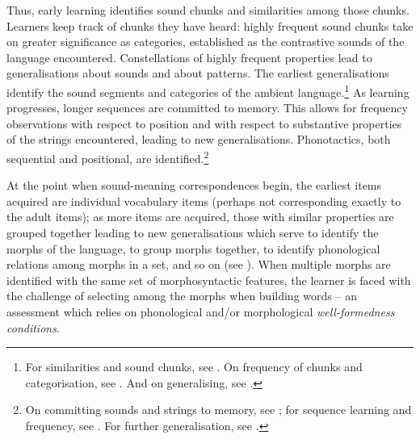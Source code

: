 Thus, early learning identifies sound chunks and similarities among those chunks. Learners keep track of chunks they have heard: highly frequent sound chunks take on greater significance as categories, established as the contrastive sounds of the language encountered. Constellations of highly frequent properties lead to generalisations about sounds and about patterns. The earliest  generalisations identify the sound  segments and categories of the ambient language.\footnote{For similarities and sound chunks, see  \citet{Newell:1990, Saffran+:2003, Christiansen+:2009, Graf+:2011, Martin+:2013}. On frequency of chunks and categorisation, see \citet{Rosch+:1976, Plunkett+:1991, Saffran+:1996san, Aslin+:1998, Zacks+:2001, Maye+:2002, Saffran:2003, Newport+:2004-I, Newport+:2004-II, Zacks+:2006, Diessel:2007, Pelucchi+:2009, Seger+:2010, Ellis+:2015, Thiessen+:2015}. And  on generalising, see \citet{Eimas+:1971, Werker+:1981, Werker+:1984, Jusczyk+:1994, Polka+:1994, Pegg+:1997, Stager+:1997, Werker+:2002, White+:2008}.}
As learning progresses, longer sequences are committed to memory. This allows for frequency observations with respect to position and with respect to substantive properties of the strings encountered, leading to new generalisations. Phonotactics, both sequential and positional, are identified.\footnote{On committing sounds and strings to memory, see \citet{Cristia+:2012, Peperkamp+:2006}; for sequence learning and frequency, see \citet{Marcus+:1999, Saffran+:2003}.  For further generalisation, see \citet{Kuhl+:1992, Jusczyk+:1993, Jusczyk+:1994, Jusczyk+:1999allophones, Gomez:2002, Martin+:2013}.}


At the point when sound-meaning correspondences begin, the earliest items acquired are individual vocabulary items (perhaps not corresponding exactly to the adult items); as more items are acquired, those with similar properties are grouped together leading to new generalisations  which serve to identify the morphs of the language, to  group morphs together, to identify phonological  relations among morphs in a set, and so on (see \citealt{Seidl+:2005, Gerken+:2008, Gerken+:2015}).  When multiple morphs are identified with the same set of morphosyntactic features, the learner is faced with the challenge of selecting among the morphs when building words -- an assessment which  relies on phonological and/or morphological \textit{well-formedness conditions}.


